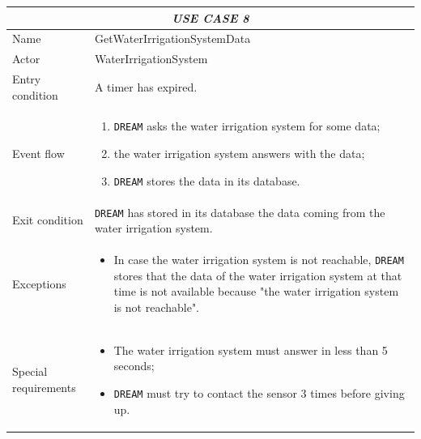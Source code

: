 \documentclass{article}
\begin{document}
\centering
\begin{tabular}{|p{3.5cm}|m{8cm}|}
 \hline
 \multicolumn{2}{|c|}{\emph{USE CASE 8}} \\
 \hline
 Name & GetWaterIrrigationSystemData\\
 \hline
 Actor & WaterIrrigationSystem\\
 \hline
 Entry condition & A timer has expired.\\
 \hline
 Event flow & \begin{enumerate}
    \item \verb|DREAM| asks the water irrigation system for some data;
    \item the water irrigation system answers with the data;
    \item \verb|DREAM| stores the data in its database.
 \end{enumerate}\\
 \hline
 Exit condition & \verb|DREAM| has stored in its database the data coming from the water irrigation system.\\
 \hline
 Exceptions & \begin{itemize}
     \item In case the water irrigation system is not reachable, \verb|DREAM| stores that the data of the water irrigation system at that time is not available because "the water irrigation system is not reachable".
 \end{itemize}\\
 \hline
 Special requirements &\begin{itemize}
     \item The water irrigation system must answer in less than 5 seconds;
     \item \verb|DREAM| must try to contact the sensor 3 times before giving up.
 \end{itemize}\\
 \hline
\end{tabular}
\end{document}
